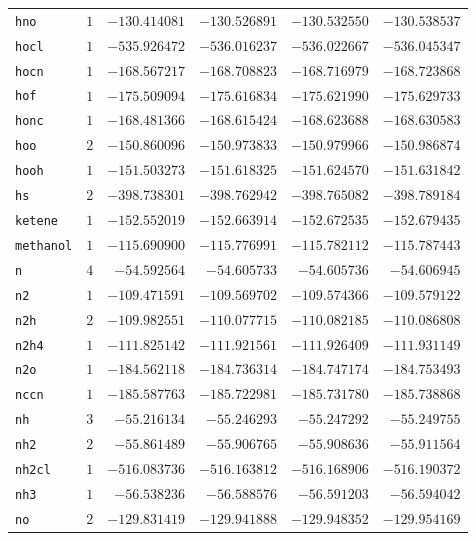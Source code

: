 {\begin{longtable}{@{}lrrrrr@{}}
    \texttt{hno} & $1$ & $-130.414081$ & $-130.526891$ & $-130.532550$ & $-130.538537$ \\
    \texttt{hocl} & $1$ & $-535.926472$ & $-536.016237$ & $-536.022667$ & $-536.045347$ \\
    \texttt{hocn} & $1$ & $-168.567217$ & $-168.708823$ & $-168.716979$ & $-168.723868$ \\
    \texttt{hof} & $1$ & $-175.509094$ & $-175.616834$ & $-175.621990$ & $-175.629733$ \\
    \texttt{honc} & $1$ & $-168.481366$ & $-168.615424$ & $-168.623688$ & $-168.630583$ \\
    \texttt{hoo} & $2$ & $-150.860096$ & $-150.973833$ & $-150.979966$ & $-150.986874$ \\
    \texttt{hooh} & $1$ & $-151.503273$ & $-151.618325$ & $-151.624570$ & $-151.631842$ \\
    \texttt{hs} & $2$ & $-398.738301$ & $-398.762942$ & $-398.765082$ & $-398.789184$ \\
    \texttt{ketene} & $1$ & $-152.552019$ & $-152.663914$ & $-152.672535$ & $-152.679435$ \\
    \texttt{methanol} & $1$ & $-115.690900$ & $-115.776991$ & $-115.782112$ & $-115.787443$ \\
    \texttt{n} & $4$ & $-54.592564$ & $-54.605733$ & $-54.605736$ & $-54.606945$ \\
    \texttt{n2} & $1$ & $-109.471591$ & $-109.569702$ & $-109.574366$ & $-109.579122$ \\
    \texttt{n2h} & $2$ & $-109.982551$ & $-110.077715$ & $-110.082185$ & $-110.086808$ \\
    \texttt{n2h4} & $1$ & $-111.825142$ & $-111.921561$ & $-111.926409$ & $-111.931149$ \\
    \texttt{n2o} & $1$ & $-184.562118$ & $-184.736314$ & $-184.747174$ & $-184.753493$ \\
    \texttt{nccn} & $1$ & $-185.587763$ & $-185.722981$ & $-185.731780$ & $-185.738868$ \\
    \texttt{nh} & $3$ & $-55.216134$ & $-55.246293$ & $-55.247292$ & $-55.249755$ \\
    \texttt{nh2} & $2$ & $-55.861489$ & $-55.906765$ & $-55.908636$ & $-55.911564$ \\
    \texttt{nh2cl} & $1$ & $-516.083736$ & $-516.163812$ & $-516.168906$ & $-516.190372$ \\
    \texttt{nh3} & $1$ & $-56.538236$ & $-56.588576$ & $-56.591203$ & $-56.594042$ \\
    \texttt{no} & $2$ & $-129.831419$ & $-129.941888$ & $-129.948352$ & $-129.954169$ \\

\end{longtable}}
